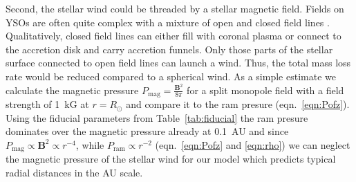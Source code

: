 \documentclass{emulateapj}
\begin{document}
Second, the stellar wind could be threaded by a stellar magnetic field. Fields on YSOs are often quite complex with a mixture of open and closed field lines \citep[e.g.][]{2011MNRAS.417..472D,2012MNRAS.425.2948D}.
Qualitatively, closed field lines can either fill with coronal plasma or connect to the accretion disk and carry accretion funnels. Only those parts of the stellar surface connected to open field lines can launch a wind. Thus, the total mass loss rate would be reduced compared to a spherical wind. 
As a simple estimate we calculate the magnetic pressure $P_{\textrm{mag}}=\frac{\boldsymbol{B}^2}{8 \pi}$ for a split monopole field with a field strength of 1~kG at $r=R_\odot$ and compare it to the ram presure (eqn.~\ref{eqn:Pofz}). Using the fiducial parameters from Table~\ref{tab:fiducial} the ram presure dominates over the magnetic pressure already at 0.1~AU and since $P_{\textrm{mag}} \propto \boldsymbol{B}^2 \propto r^{-4}$, while $P_{\textrm{ram}} \propto r^{-2}$ (eqn.~\ref{eqn:Pofz} and \ref{eqn:rho}) we can neglect the magnetic pressure of the stellar wind for our model which predicts typical radial distances in the AU scale.



\end{document}
